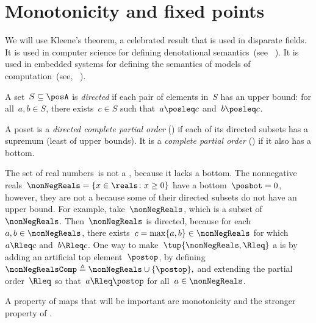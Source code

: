 

\section{Monotonicity and fixed points}
\label{sec:Monotonicity-and-fixed}

We will use Kleene's theorem, a celebrated result that is used in
disparate fields. It is used in computer science for defining denotational
semantics~(see \eg~\cite{manes86}). It is used in embedded systems
for defining the semantics of models of computation~(see, \eg~\cite{lee10}).

\begin{definition}
    \label{def:directed-set}
    A set~$S\subseteq\posA$ is \emph{directed} if each pair of elements
    in~$S$ has an upper bound: for all~$a,b\in S$, there exists~$c\in S$
    such that~$a\posleq c$ and~$b\posleq c$.
\end{definition}

\begin{definition}[Completeness]
    \label{def:cpo}A poset is a \emph{directed complete partial order}
    (\DCPO) if each of its directed subsets has a supremum (least of
    upper bounds). It is a \emph{complete partial order} (\CPO) if it
    also has a bottom.

\end{definition}
\begin{example}
    \label{exa:Rcomp}The set of real numbers~\reals is not
    a \CPO, because it lacks a bottom. The nonnegative reals~$\nonNegReals=\{x\in\reals \colon x\geq0\}$
    have a bottom~$\posbot=0$, however, they are not a \DCPO because some
    of their directed subsets do not have an upper bound. For example,
    take~$\nonNegReals$, which is a subset of~$\nonNegReals$. Then~$\nonNegReals$
    is directed, because for each~$a,b\in\nonNegReals$, there exists~$c=\max\{a,b\}\in\nonNegReals$
    for which~$a\Rleq c$ and~$b\Rleq c$. One way to make~$\tup{ \nonNegReals,\Rleq} $
    a \CPO is by adding an artificial top element~$\postop$, by defining~$\nonNegRealsComp\triangleq\nonNegReals\cup\{\postop\},$
    and extending the partial order~$\Rleq$ so that~$a\Rleq\postop$ for
    all~$a\in\nonNegReals$.
\end{example}

A property of maps that will be important are monotonicity and
the stronger property of \scottcontinuity.

